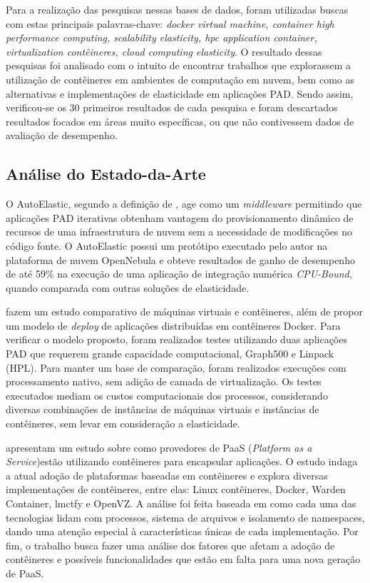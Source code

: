 \documentclass[twoside,english,brazilian]{UNISINOSartigo}
\begin{document}
Para a realização das pesquisas nessas bases de dados, foram utilizadas buscas com estas principais palavras-chave: \textit{docker virtual machine, container high performance computing, scalability elasticity, hpc application container, virtualization contêineres, cloud computing elasticity}. O resultado dessas pesquisas foi analisado com o intuito de encontrar trabalhos que explorassem a utilização de contêineres em ambientes de computação em nuvem, bem como as alternativas e implementações de elasticidade em aplicações PAD. Sendo assim, verificou-se os 30 primeiros resultados de cada pesquisa e foram descartados resultados focados em áreas muito específicas, ou que não contivessem dados de avaliação de desempenho.

\subsection{Análise do Estado-da-Arte}
\label{state}
O AutoElastic, segundo a definição de , age como um \textit{middleware} permitindo que aplicações PAD iterativas obtenham vantagem do provisionamento dinâmico de recursos de uma infraestrutura de nuvem sem a necessidade de modificações no código fonte. O AutoElastic possui um protótipo executado pelo autor na plataforma de nuvem OpenNebula e obteve resultados de ganho de desempenho de até 59\% na execução de uma aplicação de integração numérica \textit{CPU-Bound}, quando comparada com outras soluções de elasticidade. 

 fazem um estudo comparativo de máquinas virtuais e contêineres, além de propor um modelo de \textit{deploy} de aplicações distribuídas em contêineres Docker. Para verificar o modelo proposto, foram realizados testes utilizando duas aplicações PAD que requerem grande capacidade computacional, Graph500 e Linpack (HPL). Para manter um base de comparação, foram realizados execuções com processamento nativo, sem adição de camada de virtualização. Os testes executados mediam os custos computacionais dos processos, considerando diversas combinações de instâncias de máquinas virtuais e instâncias de contêineres, sem levar em consideração a elasticidade.

 apresentam um estudo sobre como provedores de PaaS (\textit{Platform as a Service})estão utilizando contêineres para encapsular aplicações. O estudo indaga a atual adoção de plataformas baseadas em contêineres e explora diversas implementações de contêineres, entre elas: Linux contêineres, Docker, Warden Container, lmctfy e OpenVZ. A análise foi feita baseada em como cada uma das tecnologias lidam com processos, sistema de arquivos e isolamento de namespaces, dando uma atenção especial à características únicas de cada implementação. Por fim, o trabalho busca fazer uma análise dos fatores que afetam a adoção de contêineres e possíveis funcionalidades que estão em falta para uma nova geração de PaaS.
\end{document}
